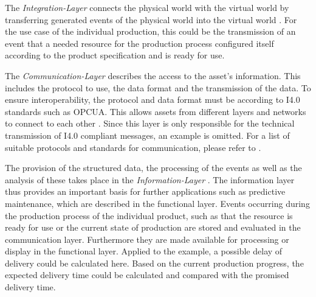 The \textit{Integration-Layer} connects the physical world with the virtual world by transferring generated events of the physical world into the virtual world \cite[p. 46]{Heidel2017ReferenzarchitekturmodellIndustrie4.0Komponente}. For the use case of the individual production, this could be the transmission of an event that a needed resource for the production process configured itself according to the product specification and is ready for use.  
    
The \textit{Communication-Layer} describes the access to the asset's information. This includes the protocol to use, the data format and the transmission of the data. To ensure interoperability, the protocol and data format must be according to \ac{I4.0} standards such as \ac{OPCUA}. This allows assets from different layers and networks to connect to each other \cite[p. 47]{Heidel2017ReferenzarchitekturmodellIndustrie4.0Komponente}. Since this layer is only responsible for the technical transmission of \ac{I4.0} compliant messages, an example is omitted. For a list of suitable protocols and standards for communication, please refer to \citet[p. 49]{Heidel2017ReferenzarchitekturmodellIndustrie4.0Komponente}.  
    
The provision of the structured data, the processing of the events as well as the analysis of these takes place in the \textit{Information-Layer} \cite[p. 51]{Heidel2017ReferenzarchitekturmodellIndustrie4.0Komponente}. The information layer thus provides an important basis for further applications such as predictive maintenance, which are described in the functional layer. Events occurring during the production process of the individual product, such as that the resource is ready for use or the current state of production are stored and evaluated in the communication layer. Furthermore they are made available for processing or display in the functional layer. Applied to the example, a possible delay of delivery could be calculated here. Based on the current production progress, the expected delivery time could be calculated and compared with the promised delivery time.
    
